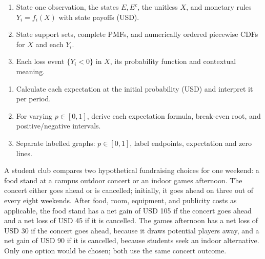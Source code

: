 \vspace{-3mm}
\noindent\begin{minipage}[t]{.49\linewidth}\vspace{0pt}
\begin{enumerate}[label=\arabic*.,itemsep=2pt,topsep=2pt,leftmargin=1.5em]
\item State one observation, the states $E,E^c$, the unitless $X$, and monetary rules $Y_i=f_i(X)$ with state payoffs (USD).
\item State support sets, complete PMFs, and numerically ordered piecewise CDFs for $X$ and each $Y_i$.
\item Each loss event $\{Y_i<0\}$ in $X$, its probability function and contextual meaning.
\end{enumerate}
\end{minipage}\hfill
\begin{minipage}[t]{.49\linewidth}\vspace{0pt}
\begin{enumerate}[label=\arabic*.,itemsep=2pt,topsep=2pt,leftmargin=1.5em]
\item Calculate each expectation at the initial probability (USD) and interpret it per period.
\item For varying $p\in[0,1]$, derive each expectation formula, break-even root, and positive/negative intervals.
\item Separate labelled graphs: $p\in[0,1]$, label endpoints, expectation and zero lines.
\end{enumerate}
\end{minipage}\par


\vspace{-3mm}
A student club compares two hypothetical fundraising choices for one weekend: a food
stand at a campus outdoor concert or an indoor games afternoon. The concert either goes
ahead or is cancelled; initially, it goes ahead on three out of every eight weekends.
After food, room, equipment, and publicity costs as applicable, the food stand has a net
gain of USD 105 if the concert goes ahead and a net loss of USD 45 if it is cancelled.
The games afternoon has a net loss of USD 30 if the concert goes ahead, because it draws
potential players away, and a net gain of USD 90 if it is cancelled, because students
seek an indoor alternative. Only one option would be chosen; both use the same concert outcome.

